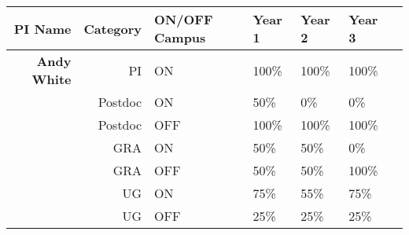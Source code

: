\begin{table}[htb]
\centering
\begin{tabular}{ || r || r |  p{1.7cm} | p{1.7cm} | p{1.7cm} || p{1.7cm} | p{1.8cm} || }
\hline\hline\hline
\textbf{PI Name} & \textbf{Category} & \textbf{ON/OFF Campus} & \textbf{Year 1} & \textbf{Year 2} & \textbf{Year 3} \\ \hline\hline
\textbf{Andy White}& PI & ON & 100\% & 100\% & 100\% \\ \hline
                                   & Postdoc & ON & 50\% & 0\% & 0\% \\ \hline
                                   & Postdoc & OFF & 100\% & 100\% & 100\% \\ \hline
                                   & GRA & ON & 50\% & 50\% & 0\% \\ \hline
                                   & GRA & OFF & 50\% & 50\% & 100\% \\ \hline
                                   & UG & ON & 75\% & 55\% & 75\% \\ \hline
                                   & UG & OFF & 25\% & 25\% & 25\% \\ \hline\hline


\end{tabular}
\end{table}
